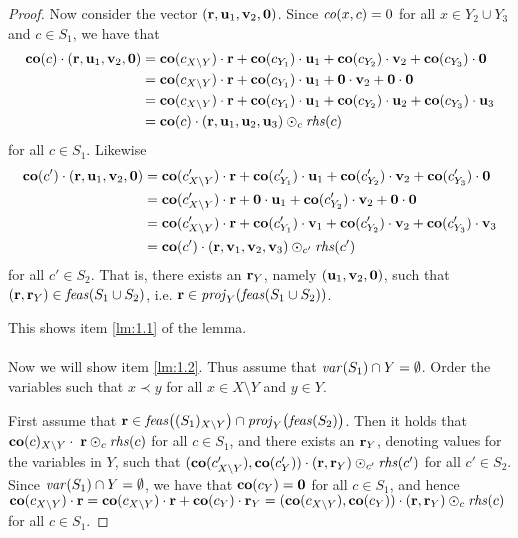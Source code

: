 \begin{proof}
Now consider the vector $(\mathbf{r}, \mathbf{u}_1, \mathbf{v}_2, \mathbf{0})$. Since $\mathit{co}(x,c)=0$ for all $x\in Y_2\cup Y_3$ and $c\in S_1$, we have that 
\begin{align*}
\mathbf{co}(c)\cdot (\mathbf{r}, \mathbf{u}_1, \mathbf{v}_2, \mathbf{0}) 
&= \mathbf{co}(c_{X\setminus Y})\cdot \mathbf{r} + \mathbf{co}(c_{Y_1})\cdot \mathbf{u}_1 + \mathbf{co}(c_{Y_2})\cdot \mathbf{v}_2 + \mathbf{co}(c_{Y_3})\cdot\mathbf{0}\\ 
&= \mathbf{co}(c_{X\setminus Y})\cdot \mathbf{r} + \mathbf{co}(c_{Y_1})\cdot \mathbf{u}_1 + \mathbf{0}\cdot \mathbf{v}_2 + \mathbf{0}\cdot\mathbf{0}\\ 
&= \mathbf{co}(c_{X\setminus Y})\cdot \mathbf{r} + \mathbf{co}(c_{Y_1})\cdot \mathbf{u}_1 + \mathbf{co}(c_{Y_2})\cdot \mathbf{u}_2 + \mathbf{co}(c_{Y_3})\cdot \mathbf{u}_3\\
&= \mathbf{co}(c)\cdot (\mathbf{r},\mathbf{u}_1,\mathbf{u}_2,\mathbf{u}_3) \odot_c \mathit{rhs}(c)
\end{align*}
for all $c\in S_1$. Likewise
\begin{align*}
\mathbf{co}(c')\cdot (\mathbf{r}, \mathbf{u}_1, \mathbf{v}_2, \mathbf{0}) 
&= \mathbf{co}(c'_{X\setminus Y})\cdot \mathbf{r} + \mathbf{co}(c'_{Y_1})\cdot \mathbf{u}_1 + \mathbf{co}(c'_{Y_2})\cdot \mathbf{v}_2 + \mathbf{co}(c'_{Y_3})\cdot\mathbf{0}\\ 
&= \mathbf{co}(c'_{X\setminus Y})\cdot \mathbf{r} + \mathbf{0}\cdot \mathbf{u}_1 + \mathbf{co}(c'_{Y_2})\cdot \mathbf{v}_2 + \mathbf{0}\cdot\mathbf{0}\\ 
&= \mathbf{co}(c'_{X\setminus Y})\cdot \mathbf{r} + \mathbf{co}(c'_{Y_1})\cdot \mathbf{v}_1 + \mathbf{co}(c'_{Y_2})\cdot \mathbf{v}_2 + \mathbf{co}(c'_{Y_3})\cdot \mathbf{v}_3\\
&= \mathbf{co}(c')\cdot (\mathbf{r},\mathbf{v}_1,\mathbf{v}_2,\mathbf{v}_3) \odot_{c'} \mathit{rhs}(c')
\end{align*}
for all $c'\in S_2$.
That is, there exists an $\mathbf{r}_Y$, namely $(\mathbf{u}_1,\mathbf{v}_2,\mathbf{0})$, such that $(\mathbf{r},\mathbf{r}_Y)\in\mathit{feas}(S_1 \cup S_2)$, i.e. $\mathbf{r}\in \mathit{proj}_Y(\mathit{feas}(S_1\cup S_2))$.

This shows item \ref{lm:1.1} of the lemma.
\\\\
Now we will show item \ref{lm:1.2}. Thus assume that $\mathit{var}(S_1)\cap Y = \emptyset$. Order the variables such that $x\prec y$ for all $x\in X\setminus Y$ and $y\in Y$.

First assume that $\mathbf{r}\in \mathit{feas}\big((S_1)_{X\setminus Y}\big)\cap \mathit{proj}_Y\big(\mathit{feas}(S_2)\big)$. Then it holds that $\mathbf{co}(c)_{X\setminus Y}\cdot\;\mathbf{r} \odot_c\mathit{rhs}(c)$ for all $c\in S_1$, and there exists an $\mathbf{r}_Y$, denoting values for the variables in $Y$, such that $(\mathbf{co}(c'_{X\setminus Y}),\mathbf{co}(c'_Y))\cdot(\mathbf{r},\mathbf{r}_Y)\odot_{c'}\mathit{rhs}(c')$ for all $c'\in S_2$.
Since $\mathit{var}(S_1)\cap Y = \emptyset$, we have that $\mathbf{co}(c_Y)=\mathbf{0}$ for all $c\in S_1$, and hence 
$\mathbf{co}(c_{X\setminus Y})\cdot\mathbf{r} = \mathbf{co}(c_{X\setminus Y})\cdot\mathbf{r} + \mathbf{co}(c_Y)\cdot\mathbf{r}_Y = (\mathbf{co}(c_{X\setminus Y}),\mathbf{co}(c_Y))\cdot(\mathbf{r},\mathbf{r}_Y)\odot_{c}\mathit{rhs}(c)$ for all $c\in S_1$. 


\end{proof}
